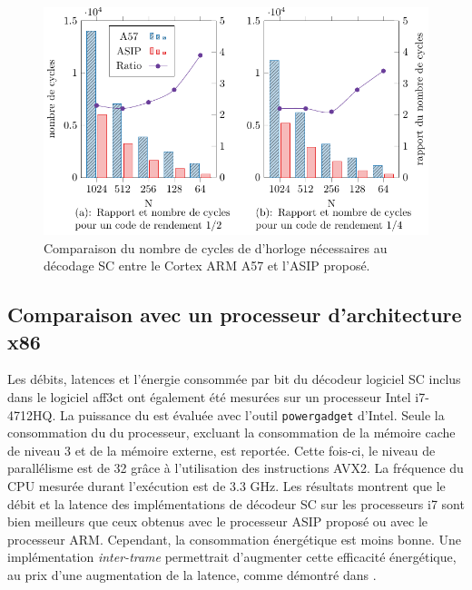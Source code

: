 \begin{figure}[htp]
\centering
\includegraphics{main/ch3_fig/curves/cycle_count/cycle_count}
\caption{Comparaison du nombre de cycles de d'horloge nécessaires au décodage SC entre le Cortex ARM A57 et l'ASIP proposé.}
\label{fig:cycle_count}
\end{figure}

\subsection{Comparaison avec un processeur d'architecture x86}
Les débits, latences et l'énergie consommée par bit du décodeur logiciel SC inclus dans le logiciel aff3ct ont également été mesurées sur un processeur Intel i7-4712HQ.
La puissance du \coeur est évaluée avec l'outil \texttt{powergadget} d'Intel. Seule la consommation du \coeur du processeur, excluant la consommation de la mémoire cache de niveau 3 et de la mémoire externe, est reportée. Cette fois-ci, le niveau de parallélisme est de 32 grâce à l'utilisation des instructions AVX2. La fréquence du CPU mesurée durant l'exécution est de 3.3 GHz. Les résultats montrent que le débit et la latence des implémentations de décodeur SC sur les processeurs i7 sont bien meilleurs que ceux obtenus avec le processeur ASIP proposé ou avec le processeur ARM. Cependant, la consommation énergétique est moins bonne. Une implémentation \textit{inter-trame} permettrait d'augmenter cette efficacité énergétique, au prix d'une augmentation de la latence, comme démontré dans \cite{cassagne_energy_2016}.



